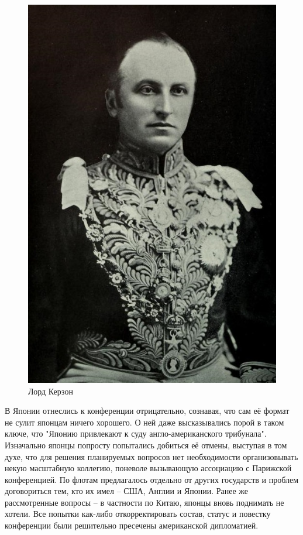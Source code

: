 \begin{figure}[h!tb] 
	\centering\includegraphics[scale=0.4]{Glava6/ml4n5yxZ3No.jpg}
	\caption{Лорд Керзон}%
\end{figure}

В Японии отнеслись к конференции отрицательно, сознавая, что сам её формат не сулит японцам ничего хорошего. О ней даже высказывались порой в таком ключе, что "Японию привлекают к суду англо-американского трибунала". Изначально японцы попросту попытались добиться её отмены, выступая в том духе, что для решения планируемых вопросов нет необходимости организовывать некую масштабную коллегию, поневоле вызывающую ассоциацию с Парижской конференцией. По флотам предлагалось отдельно от других государств и проблем договориться тем, кто их имел – США, Англии и Японии. Ранее же рассмотренные вопросы – в частности по Китаю, японцы вновь поднимать не хотели. Все попытки как-либо откорректировать состав, статус и повестку конференции были решительно пресечены американской дипломатией.


